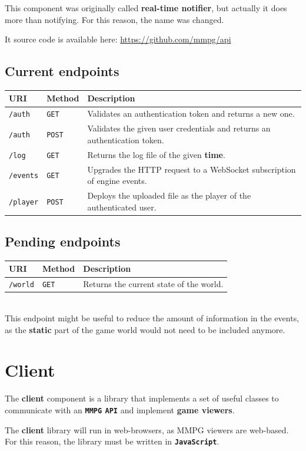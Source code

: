 \documentclass[a4paper,11pt,titlepage,abstract,numbers=noenddot,automark,mnsy,intlimits,rgb,dvipsnames]{report}
\begin{document}
This component was originally called \textbf{real-time notifier}, but actually it does more than notifying. For this reason,
the name was changed.

It source code is available here: \url{https://github.com/mmpg/api}
\section{Current endpoints}
\begin{tabularx}{\textwidth}{l | l | X}
\textbf{URI} & \textbf{Method} & \textbf{Description}\\
\hline
\texttt{/auth} & \texttt{GET} & Validates an authentication token and returns a new one.\\
\texttt{/auth} & \texttt{POST} & Validates the given user credentials and returns an authentication token.\\
\texttt{/log} & \texttt{GET} & Returns the log file of the given \textbf{time}.\\
\texttt{/events} & \texttt{GET} & Upgrades the HTTP request to a WebSocket subscription of engine events.\\
\texttt{/player} & \texttt{POST} & Deploys the uploaded file as the player of the authenticated user.\\
\end{tabularx}
\section{Pending endpoints}
\begin{tabularx}{\textwidth}{l | l | X}
\textbf{URI} & \textbf{Method} & \textbf{Description}\\
\hline
\texttt{/world} & \texttt{GET} & Returns the current state of the world.\\
\end{tabularx}
\\[0.2cm]
\indent
This endpoint might be useful to reduce the amount of information in the events, as the \textbf{static} part of
the game world would not need to be included anymore.
\clearpage
\chapter{Client}
The \textbf{client} component is a library that implements a set of useful classes to communicate with
an \textbf{\texttt{MMPG} \texttt{API}} and implement \textbf{game viewers}.

The \textbf{client} library will run in web-browsers, as \texttt{}MMPG\texttt{} viewers are web-based. For this reason, the library
must be written in \textbf{\texttt{JavaScript}}.
\end{document}
